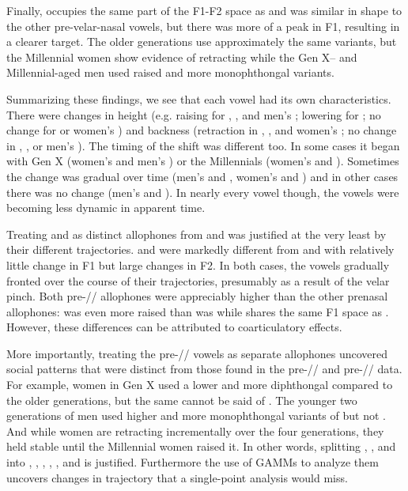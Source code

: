 Finally, \bing occupies the same part of the F1-F2 space as \face and was similar in shape to the other pre-velar-nasal vowels, but there was more of a peak in F1, resulting in a clearer target. The older generations use approximately the same variants, but the Millennial women show evidence of retracting \bing while the Gen X-- and Millennial-aged men used raised and more monophthongal variants.

Summarizing these findings, we see that each vowel had its own characteristics. There were changes in height (e.g. raising for \ban, \bang, and men's \bing; lowering for \ben; no change for \bin or women's \bing) and backness (retraction in \ben, \bin, and women's \bing; no change in \ban, \bang, or men's \bing). The timing of the shift was different too. In some cases it began with Gen X (women's \ban and men's \bing) or the Millennials (women's \ban and \bing). Sometimes the change was gradual over time (men's \ban and \bang, women's \ben and \bin) and in other cases there was no change (men's \ben and \bin). In nearly every vowel though, the vowels were becoming less dynamic in apparent time.

Treating \bing and \bang as distinct allophones from \bin and \ban was justified at the very least by their different trajectories. \bang and \bing were markedly different from \ban and \bin with relatively little change in F1 but large changes in F2. In both cases, the vowels gradually fronted over the course of their trajectories, presumably as a result of the velar pinch. Both pre-// allophones were appreciably higher than the other prenasal allophones: \bang was even more raised than \ban was while \bing shares the same F1 space as \bit. However, these differences can be attributed to coarticulatory effects.

More importantly, treating the pre-// vowels as separate allophones uncovered social patterns that were distinct from those found in the pre-// and pre-// data. For example, women in Gen X used a lower and more diphthongal \ban compared to the older generations, but the same cannot be said of \bang. The younger two generations of men used higher and more monophthongal variants of \bing but not \bin. And while women are retracting \bin incrementally over the four generations, they held \bing stable until the Millennial women raised it. In other words, splitting \trap, \dress, and \kit into \ban, \bang, \ben, \beng, \bin, and \bing is justified. Furthermore the use of GAMMs to analyze them uncovers changes in trajectory that a single-point analysis would miss.





